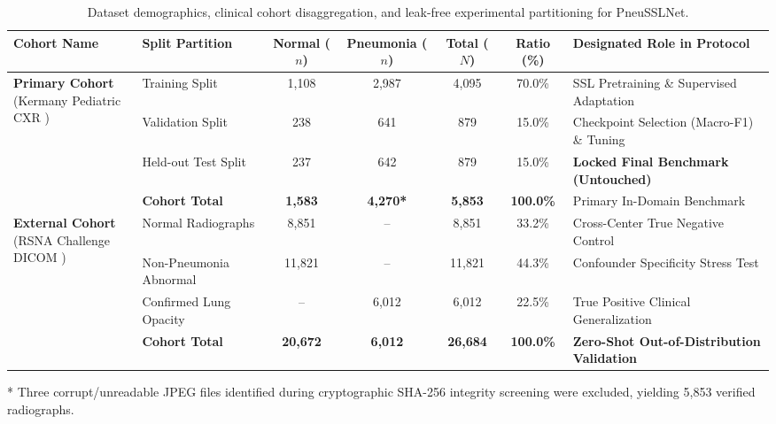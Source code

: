 \documentclass[journal,article,submit,moreauthors,pdftex]{Definitions/tsp}
\begin{document}
\begin{table}[t]
\tablesize{\scriptsize}
\centering
\caption{Dataset demographics, clinical cohort disaggregation, and leak-free experimental partitioning for PneuSSLNet.}
\label{tab:dataset_splits}
\begin{threeparttable}
\begin{adjustbox}{max width=\textwidth}
\begin{tabular}{l l c c c c l}
\toprule
\textbf{Cohort Name} & \textbf{Split Partition} & \textbf{Normal ($n$)} & \textbf{Pneumonia ($n$)} & \textbf{Total ($N$)} & \textbf{Ratio (\%)} & \textbf{Designated Role in Protocol} \\
\midrule
\multirow{3}{*}{\parbox{2.8cm}{\textbf{Primary Cohort}\\(Kermany Pediatric CXR \cite{Kermany18})}} 
& Training Split & 1,108 & 2,987 & 4,095 & 70.0\% & SSL Pretraining \& Supervised Adaptation \\
& Validation Split & 238 & 641 & 879 & 15.0\% & Checkpoint Selection (Macro-F1) \& Tuning \\
& Held-out Test Split & 237 & 642 & 879 & 15.0\% & \textbf{Locked Final Benchmark (Untouched)} \\
\cmidrule{2-7}
& \textbf{Cohort Total} & \textbf{1,583} & \textbf{4,270*} & \textbf{5,853} & \textbf{100.0\%} & Primary In-Domain Benchmark \\
\midrule
\multirow{3}{*}{\parbox{2.8cm}{\textbf{External Cohort}\\(RSNA Challenge DICOM \cite{Shih19})}} 
& Normal Radiographs & 8,851 & -- & 8,851 & 33.2\% & Cross-Center True Negative Control \\
& Non-Pneumonia Abnormal & 11,821 & -- & 11,821 & 44.3\% & Confounder Specificity Stress Test \\
& Confirmed Lung Opacity & -- & 6,012 & 6,012 & 22.5\% & True Positive Clinical Generalization \\
\cmidrule{2-7}
& \textbf{Cohort Total} & \textbf{20,672} & \textbf{6,012} & \textbf{26,684} & \textbf{100.0\%} & \textbf{Zero-Shot Out-of-Distribution Validation} \\
\bottomrule
\end{tabular}
\end{adjustbox}
\begin{tablenotes}
\item[*] Three corrupt/unreadable JPEG files identified during cryptographic SHA-256 integrity screening were excluded, yielding 5,853 verified radiographs.
\end{tablenotes}
\end{threeparttable}
\end{table}
\end{document}
